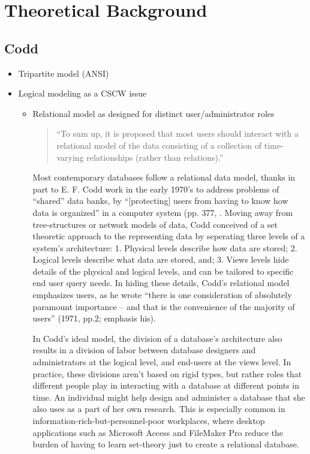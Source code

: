 \section{Theoretical Background}

\subsection{Codd}
\begin{itemize}
\item Tripartite model (ANSI)
\item Logical modeling as a CSCW issue
\begin{itemize}
\item Relational model as designed for distinct user/administrator roles

\begin{quote}
“To sum up, it is proposed that most users should interact with a relational model of the data consisting of a collection of time-varying relationships (rather than relations).”
\end{quote}

Most contemporary databases follow a relational data model, thanks in part to E. F. Codd work in the early 1970's to address problems of “shared” data banks, by  “[protecting] users from having to know how data is organized” in a computer system (pp. 377, \cite{Codd_1970}. Moving away from tree-structures or network models of data, Codd conceived of a set theoretic approach to the representing data by seperating three levels of a system's architecture: 1. Physical levels describe how data are stored; 2. Logical levels describe what data are stored, and; 3. Views levels hide details of the physical and logical levels, and can be tailored to specific end user query needs. In hiding these details, Codd's relational model emphasizes users, as he wrote “there is one consideration of absolutely paramount importance – and that is the convenience of the majority of users” (1971, pp.2; emphasis his). 

In Codd's ideal model, the division of a database's architecture also results in a division of labor between database designers and administrators at the logical level, and end-users at the views level. In practice, these divisions aren't based on rigid types, but rather roles that different people play in interacting with a database at different points in time. An individual might help design and administer a database that she also uses as a part of her own research. This is especially common in information-rich-but-personnel-poor workplaces, where desktop applications such as Microsoft Access and FileMaker Pro reduce the burden of having to learn set-theory just to create a relational database. 


\end{itemize}
\end{itemize}
